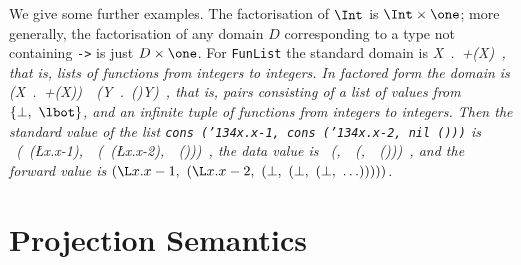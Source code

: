 \begin{article}
We give some further examples.  The factorisation of
$\Int$ is $\Int\times\one$; more generally, the factorisation of any
domain $D$ corresponding to a type not containing \mbox{\tt ->} is just
$D\times\one$.  For \mbox{\tt FunList} the standard domain is
\beqqs
\it \mu{}X\ .\ \lone+(\x{}X)\ ,
\eeqqs
that is, lists of functions from integers to integers. In factored form
the domain is
\beqqs
\it (\mu{}X\ .\ \lone+(\lone\x{}X))\ \x\ (\mu{}Y\ .\ (\fto{})\x{}Y)\ ,
\eeqqs
that is, pairs consisting of a list of values from $\{\bot,\ \lbot\}$, and
an infinite tuple of functions from integers to integers.  Then the 
standard value of the list \mbox{\tt cons\ ({\char'134}x.x-1,\ cons\ ({\char'134}x.x-2,\ nil\ ()))} is
\beqqs
\it {}\ (\ (\L{}x.x-{\rm1}),\ \ (\ (\L{}x.x-{\rm2}),\ \ ()))\ ,
\eeqqs
the data value is
\beqqs
\it {}\ (\lunit,\ \ (\lunit,\ \ ()))\ ,
\eeqqs
and the forward value is 
$(\L x.x-1,~(\L x.x-2,~(\bot,~(\bot,~(\bot,~\ldots)))))$.

\section{Projection Semantics}


\end{article}
